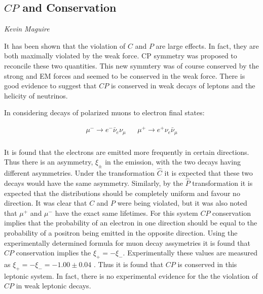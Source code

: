 




\subsection{$CP$ and Conservation}
\vspace{-1.0em}
\begin{center}
\tiny{\textit{Kevin Maguire}}
\end{center}

It has been shown that the violation of $C$ and $P$ are large effects. In fact, they are both maximally violated by the weak force. CP symmetry was proposed to reconcile these two quantities. This new symmtery was of course conserved by the strong and EM forces and seemed to be conserved in the weak force. There is good evidence to suggest that $CP$ is conserved in weak decays of leptons and the helicity of neutrinos.

In considering decays of polarized muons to electron final states:

\begin{align*}
\mu^{-} \rightarrow e^{-} \bar{\nu}_{e} \nu_{\mu} & & \mu^{+} \rightarrow e^{+} \nu_{e} \bar{\nu}_{\mu} \\ 
\end{align*}

\noindent It is found that the electrons are emitted more frequently in certain directions. Thus there is an asymmetry, $\xi_{\pm}$ in the emission, with the two decays having different asymmetries. Under the transformation $\hat{C}$ it is expected that these two decays would have the same asymmetry. Similarly, by the $\hat{P}$ transformation it is expected that the distributions should be completely uniform and favour no direction. It was clear that $C$ and $P$ were being violated, but it was also noted that $\mu^{+}$ and $\mu^{-}$ have the exact same lifetimes. For this system $CP$ conservation implies that the probability of an electron in one direction should be equal to the probability of a positron being emitted in the opposite direction. Using the experimentally determined formula for muon decay assymetries it is found that $CP$ conservation implies the $\xi_{+} = - \xi_{-}$. Experimentally these values are measured as $\xi_{+} = - \xi_{-} =  - 1.00 \pm 0.04$ \cite{Martin+Shaw}. Thus it is found that $CP$ is conserved in this leptonic system. In fact, there is no experimental evidence for the the violation of $CP$ in weak leptonic decays.

